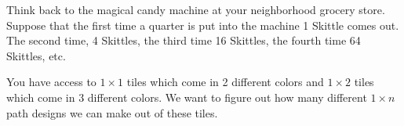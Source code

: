 \documentclass[12pt]{article}
\begin{document}
\begin{activity}
\begin{questions}


\question Think back to the magical candy machine at your neighborhood grocery store. Suppose that the first time a quarter is put into the machine 1 Skittle comes out. The second time, 4 Skittles, the third time 16 Skittles, the fourth time 64 Skittles, etc.

\question  You have access to $1 \times 1$ tiles which come in 2 different colors and $1\times 2$ tiles which come in 3 different colors.  We want to figure out how many different $1 \times n$ path designs we can make out of these tiles.

\end{questions}
\end{activity}
\end{document}
